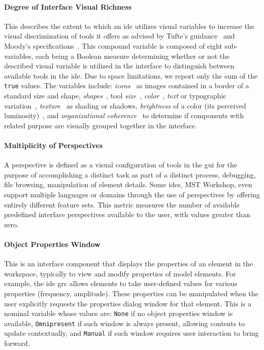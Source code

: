 \paragraph{Degree of Interface Visual Richness}
This describes the extent to which an \ac{ide} utilizes visual variables to increase the visual discrimination of tools it offers as advised by Tufte's guidance~\cite{Tufte2001} and Moody's specifications~\cite{moody2009}.
This compound variable is composed of eight sub-variables, each being a Boolean measure determining whether or not the described visual variable is utilized in the interface to distinguish between available tools in the \ac{ide}.
Due to space limitations, we report only the sum of the \texttt{true} values.
The variables include:
\emph{icons}~\cite{costagliola2002,moody2009} as images contained in a border of a standard size and shape,
\emph{shapes}~\cite{moody2009},
tool \emph{size}~\cite{moody2009},
\emph{color}~\cite{moody2009},
\emph{text} or typographic variation~\cite{moody2009},
\emph{texture}~\cite{moody2009} as shading or shadows,
\emph{brightness} of a color (\ie its perceived luminosity)~\cite{moody2009},
and
\emph{organizational coherence}~\cite{constantine1996} to determine if components with related purpose are visually grouped together in the interface.


\paragraph{Multiplicity of Perspectives}
A perspective is defined as a visual configuration of tools in the \ac{gui}
for the purpose of accomplishing a distinct task as part of a distinct
process, \eg debugging, file browsing, manipulation of element details.
Some \acp{ide}, \eg MST Workshop, even support multiple languages or
domains through the use of perspectives by offering entirely different
feature sets. This metric measures the number of available predefined
interface perspectives available to the user, with values greater than
zero.


\paragraph{Object Properties Window}
This is an interface component that displays the properties of an element
in the workspace, typically to view and modify properties of model
elements. For example, the \ac{ide} \ac{grc} allows elements to take
user-defined values for various properties (\eg frequency, amplitude).
These properties can be manipulated when the user explicitly requests the
properties dialog window for that element.
This is a nominal variable whose values are:
\texttt{None} if no object properties window is available,
\texttt{Omnipresent} if such window is always present, allowing contents to update contextually,
and \texttt{Manual} if such window requires user interaction to bring forward.


